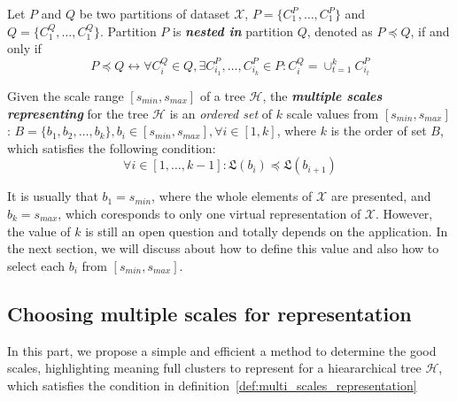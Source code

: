 \begin{definition}
\label{def:nested_in} 
Let $P$ and $Q$ be two partitions of dataset $\mathcal{X}$, $P = \{C_{1}^{P}, \ldots, C_{1}^{P}\}$ and $Q = \{C_{1}^{Q}, \ldots, C_{1}^{Q}\}$. Partition $P$ is \textbf{\textit{nested in}} partition $Q$, denoted as $P \preceq Q$, if and only if
\begin{equation}
\label{equ:nested_in}
P \preceq Q  \leftrightarrow \forall C_i^{Q} \in Q, \exists C^{P}_{i_{1}},\ldots, C^{P}_{i_{k}} \in P: C_i^Q = \cup_{t=1}^{k} C^{P}_{i_{t}}
\end{equation}
\end{definition}
\begin{definition}
\label{def:multi_scales_representation} Given the scale range $[s_{min},s_{max}]$ of a tree $\mathcal{H}$, the \textbf{\textit{multiple scales representing}} for the tree $\mathcal{H}$ is an \emph{ordered set} of $k$ scale values from $[s_{min},s_{max}]$: $\mathsf{\textit{B}} = \{b_1, b_2, \ldots, b_k\}, b_i \in [s_{min},s_{max}], \forall i \in [1,k]$, where $k$ is the order of set $\mathsf{\textit{B}}$, which satisfies the following condition:
\begin{equation}
\label{equ:multi_scales_represent}
\forall i \in [1, \ldots, k-1] : \mathfrak{L}(b_i)  \preceq \mathfrak{L}(b_{i+1})
\end{equation}
\end{definition}
It is usually that $b_1 = s_{min}$, where the whole elements of $\mathcal{X}$ are presented, and $b_k = s_{max}$, which coresponds to only one virtual representation of $\mathcal{X}$. However, the value of $k$ is still an open question and totally depends on the application. In the next section, we will discuss about how to define this value and also how to select each $b_i$ from $[s_{min},s_{max}]$.

\subsection{Choosing multiple scales for representation}
\label{subsec:choosing_multiple_scales}
In this part, we propose a simple and efficient a method to determine the good scales, highlighting meaning full clusters to represent for a hieararchical tree $\mathcal{H}$, which satisfies the condition in definition~\ref{def:multi_scales_representation}

